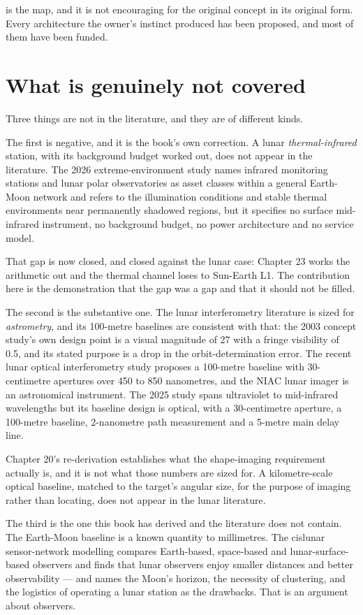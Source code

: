  is the map, and it is not encouraging for the original
concept in its original form. Every architecture the owner's instinct
produced has been proposed, and most of them have been funded.

\section{What is genuinely not covered}

Three things are not in the literature, and they are of different kinds.

The first is negative, and it is the book's own correction. A lunar
\emph{thermal-infrared} station, with its background budget worked out, does
not appear in the literature. The 2026 extreme-environment study names
infrared monitoring stations and lunar polar observatories as asset classes
within a general Earth-Moon network and refers to the illumination conditions
and stable thermal environments near permanently shadowed regions, but it
specifies no surface mid-infrared instrument, no background budget, no power
architecture and no service model.

That gap is now closed, and closed against the lunar case: Chapter 23 works
the arithmetic out and the thermal channel loses to Sun-Earth L1. The
contribution here is the demonstration that the gap was a gap and that it
should not be filled.

The second is the substantive one. The lunar interferometry literature is
sized for \emph{astrometry}, and its 100-metre baselines are consistent
with that: the 2003 concept study's own design point is a visual magnitude
of 27 with a fringe visibility of 0.5, and its stated purpose is a drop in
the orbit-determination error. The recent lunar optical interferometry study
proposes a 100-metre baseline with 30-centimetre apertures over 450 to 850
nanometres, and the NIAC lunar imager is an astronomical instrument. The
2025 study spans ultraviolet to mid-infrared wavelengths but its baseline
design is optical, with a 30-centimetre aperture, a 100-metre baseline,
2-nanometre path measurement and a 5-metre main delay line.

Chapter 20's re-derivation establishes what the shape-imaging requirement
actually is, and it is not what those numbers are sized for. A
kilometre-scale optical baseline, matched to the target's angular size, for
the purpose of imaging rather than locating, does not appear in the lunar
literature.

The third is the one this book has derived and the literature does not
contain. The Earth-Moon baseline is a known quantity to millimetres. The
cislunar sensor-network modelling compares Earth-based, space-based and
lunar-surface-based observers and finds that lunar observers enjoy smaller
distances and better observability --- and names the Moon's horizon, the
necessity of clustering, and the logistics of operating a lunar station as
the drawbacks. That is an argument about observers.

